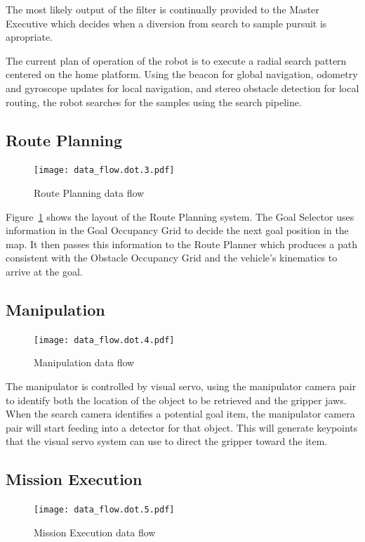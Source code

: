 \documentclass[12pt]{article}
\begin{document}
The most likely output of the filter is continually provided to the Master
Executive which decides when a diversion from search to sample pursuit is
apropriate.

The current plan of operation of the robot is to execute a radial search
pattern centered on the home platform. Using the beacon for global navigation,
odometry and gyroscope updates for local navigation, and stereo obstacle
detection for local routing, the robot searches for the samples
using the search pipeline.

\subsection{Route Planning}
\begin{figure}[htbp]
\centering
\texttt{[image: data\_flow.dot.3.pdf]}
\caption{Route Planning data flow}
\label{fig_df_rp}
\end{figure}
Figure~\ref{fig_df_rp} shows the layout of the Route Planning system. The Goal Selector uses information in the Goal Occupancy Grid to decide the next goal position in the map. It then passes this information to the Route Planner which produces a path consistent with the Obstacle Occupancy Grid and the vehicle's kinematics to arrive at the goal.


\subsection{Manipulation}\label{Manipulation}
\begin{figure}[htbp]
\centering
\texttt{[image: data\_flow.dot.4.pdf]}
\caption{Manipulation data flow}
\label{fig_df_man}
\end{figure}

The manipulator is controlled by visual servo, using the manipulator camera pair to identify both the location of the object to be retrieved and the gripper jaws. When the search camera identifies a potential goal item, the manipulator camera pair will start feeding into a detector for that object. This will generate keypoints that the visual servo system can use to direct the gripper toward the item.


\subsection{Mission Execution}\label{MissionExecution}
\begin{figure}[htbp]
\centering
\texttt{[image: data\_flow.dot.5.pdf]}
\caption{Mission Execution data flow}
\label{fig_df_exec}
\end{figure}
\end{document}
